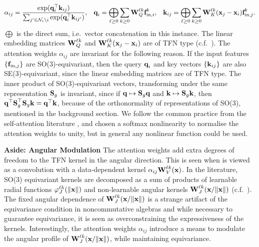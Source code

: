 \documentclass{article}
\begin{document}
\begin{align}
\label{eq:att_equi_weights}
    \alpha_{ij} = \frac{\exp ( \textbf{q}_i^{\top} \textbf{k}_{ij} ) }{\sum_{j' \in \mathcal{N}_i\setminus i} \exp ( \textbf{q}_i^{\top} \textbf{k}_{ij'})}, \;\;\; \textbf{q}_i = \bigoplus_{\ell \geq 0} \sum_{k \geq 0}\textbf{W}_Q^{\ell k}\textbf{f}_{\text{in},i}^k, \;\;\; \textbf{k}_{ij} = \bigoplus_{\ell \geq 0} \sum_{k\geq 0} \textbf{W}_K^{\ell k}(\textbf{x}_j - \textbf{x}_i) \textbf{f}_{\text{in},j}^k.
\end{align}
$\bigoplus$ is the direct sum, i.e.\ vector concatenation in this instance. The linear embedding matrices $\textbf{W}_Q^{\ell k}$ and $\textbf{W}_K^{\ell k}(\textbf{x}_j - \textbf{x}_i)$ are of TFN type (c.f.\ ). The attention weights $\alpha_{ij}$ are invariant for the following reason. If the input features $\{ \textbf{f}_{\text{in},j} \}$ are SO(3)-equivariant, then the query $\textbf{q}_i$ and key vectors $\{\textbf{k}_{ij}\}$ are also SE(3)-equivariant, since the linear embedding matrices are of TFN type. The inner product of SO(3)-equivariant vectors, transforming under the same representation $\textbf{S}_g$ is invariant, since if $\textbf{q} \mapsto \textbf{S}_g \textbf{q}$ and $\textbf{k} \mapsto \textbf{S}_g \textbf{k}$, then $\textbf{q}^\top \textbf{S}_g^\top \textbf{S}_g \textbf{k} = \textbf{q}^\top \textbf{k}$, because of the orthonormality of representations of SO(3), mentioned in the background section. We follow the common practice from the self-attention literature \citep{VaswaniSPUJGKP17,SetTransformer}, and chosen a softmax nonlinearity to normalise the attention weights to unity, but in general any nonlinear function could be used.

\textbf{Aside: Angular Modulation}
The attention weights add extra degrees of freedom to the TFN kernel in the angular direction. This is seen when  is viewed as a convolution with a data-dependent kernel $\alpha_{ij} \textbf{W}_V^{\ell k}(\textbf{x})$. In the literature, SO(3) equivariant kernels are decomposed as a sum of products of learnable radial functions $\varphi_J^{\ell k}(\|\textbf{x}\|)$ and non-learnable angular kernels $\textbf{W}_J^{\ell k}(\textbf{x} / \|\textbf{x}\|)$ (c.f.\ ). The fixed angular dependence of $\textbf{W}_J^{\ell k}(\textbf{x} / \|\textbf{x}\|)$ is a strange artifact of the equivariance condition in noncommutative algebras and while necessary to guarantee equivariance, it is seen as overconstraining the expressiveness of the kernels. Interestingly, the attention weights $\alpha_{ij}$ introduce a means to modulate the angular profile of $\textbf{W}_J^{\ell k}(\textbf{x} / \|\textbf{x}\|)$, while maintaining equivariance.
\end{document}
